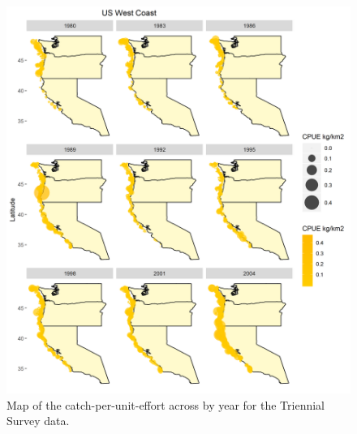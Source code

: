 \documentclass[12pt,]{article}
\begin{document}
\FloatBarrier

\begin{figure}
\centering
\includegraphics{Figures/Triennial_CPUE_Map_Year.png}
\caption{Map of the catch-per-unit-effort across by year for the
Triennial Survey data. \label{fig:tri_map}}
\end{figure}

\FloatBarrier
\end{document}
